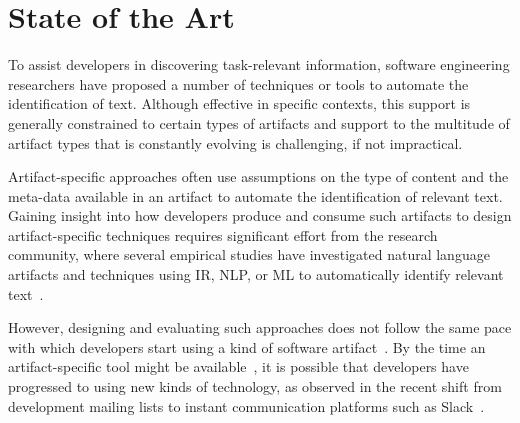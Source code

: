 \section{State of the Art}
\label{cp1:novelty}



To assist developers in discovering task-relevant information,
software engineering researchers have proposed 
a number of techniques or tools 
to automate the identification of  text.
Although effective in specific contexts, this support is generally constrained 
to certain
types of artifacts and support to the multitude of artifact types that is constantly evolving
is challenging, if not impractical.



Artifact-specific approaches often use assumptions on the type of content 
and the meta-data available in an artifact
to automate the identification of relevant text.
Gaining insight into how developers produce and consume 
such artifacts to design artifact-specific techniques
 requires significant effort from the research community,
 where several empirical studies have investigated 
natural language artifacts 
and techniques using \acf{IR}, \acf{NLP}, or \acf{ML}  to automatically identify
relevant text~\cite{panichella2012, Ko2006, Arya2019, Maalej2013}.


However, designing and evaluating such approaches
does not follow the same pace with which developers start using
a kind of software artifact~\cite{garousi2019}.
By the time an artifact-specific tool might be available~\cite{gibbs1994},
it is possible 
that developers have progressed to using new kinds of technology,
as observed in the recent shift from 
development mailing lists to instant communication platforms such as Slack~\cite{Lin2016}. 










